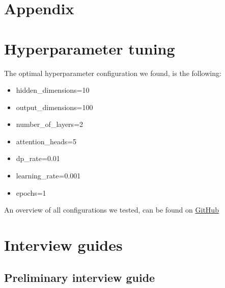 \section{Appendix}
\appendix
\section{Hyperparameter tuning}
\label{app:hyperparameter}

The optimal hyperparameter configuration we found, is the following: 

\begin{itemize}
    \item hidden\_dimensions=10
    \item output\_dimensions=100
    \item number\_of\_layers=2
    \item attention\_heads=5
    \item dp\_rate=0.01
    \item learning\_rate=0.001
    \item epochs=1
\end{itemize}

An overview of all configurations we tested, can be found on \href{}{GitHub}

\newpage

\section{Interview guides}

\subsection{Preliminary interview guide}
\label{app:interview_guide}


